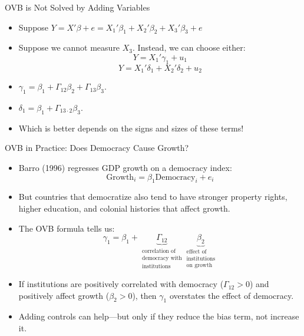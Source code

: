 \documentclass[aspectratio=169, handout, t]{beamer}
\numberwithin{equation}{section}
\begin{document}
\begin{frame}{OVB is Not Solved by Adding Variables}
\begin{itemize}
\item Suppose $Y=X'\beta+e=X_1'\beta_1+X_2'\beta_2+X_3'\beta_3+e$
\item Suppose we cannot measure $X_3$.  Instead, we can choose either:
$$Y=X_1'\gamma_1+u_1$$
$$Y=X_1'\delta_1+X_2'\delta_2+u_2$$
\item $\gamma_1=\beta_1+\Gamma_{12}\beta_2+\Gamma_{13}\beta_3$.
\item $\delta_1=\beta_1+\Gamma_{13\cdot 2}\beta_3$.
\item Which is better depends on the signs and sizes of these terms!
\end{itemize}
\end{frame}


\begin{frame}{OVB in Practice: Does Democracy Cause Growth?}
\begin{itemize}
\item Barro (1996) regresses GDP growth on a democracy index:
$$\text{Growth}_i = \beta_1 \text{Democracy}_i + e_i$$
\item But countries that democratize also tend to have stronger property rights, higher education, and colonial histories that affect growth.\pause
\item The OVB formula tells us:
$$\gamma_1 = \beta_1 + \underbrace{\Gamma_{12}}_{\substack{\text{correlation of}\\\text{democracy with}\\\text{institutions}}}\underbrace{\beta_2}_{\substack{\text{effect of}\\\text{institutions}\\\text{on growth}}}$$\pause
\item If institutions are positively correlated with democracy ($\Gamma_{12}>0$) and positively affect growth ($\beta_2>0$), then $\gamma_1$ \alert{overstates} the effect of democracy.
\item Adding controls can help---but only if they reduce the bias term, not increase it.
\end{itemize}
\end{frame}
\end{document}
